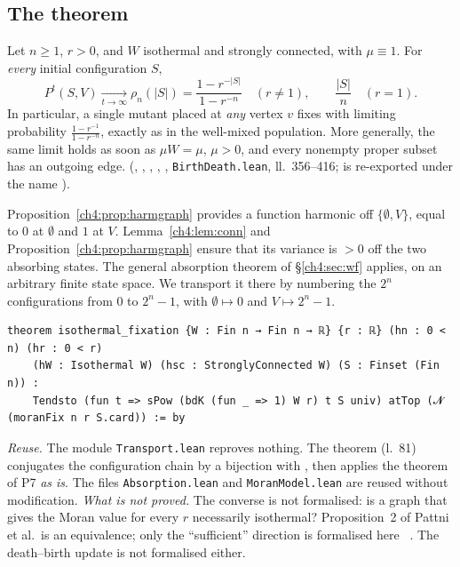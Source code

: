 \subsection{The theorem}
\begin{theorem}\label{ch4:thm:iso}
Let $n\ge1$, $r>0$, and $W$ isothermal and strongly connected, with $\mu\equiv1$. For \emph{every} initial
configuration $S$,
\[
P^t(S,V)\xrightarrow[t\to\infty]{}\rho_n(|S|)=\frac{1-r^{-|S|}}{1-r^{-n}}\quad(r\ne1),\qquad\frac{|S|}{n}\quad(r=1).
\]
In particular, a single mutant placed at \emph{any} vertex $v$ fixes with limiting probability
$\frac{1-r^{-1}}{1-r^{-n}}$, exactly as in the well-mixed population. More generally, the same limit
holds as soon as $\mu W=\mu$, $\mu>0$, and every nonempty proper subset has an outgoing edge.
\tierA{} (, , ,
, , \texttt{BirthDeath.lean}, ll.~356--416;  is re-exported under the name ).
\end{theorem}

\begin{humanproof}
Proposition~\ref{ch4:prop:harmgraph} provides a function harmonic off $\{\emptyset,V\}$, equal to $0$ at
$\emptyset$ and $1$ at $V$. Lemma~\ref{ch4:lem:conn} and Proposition~\ref{ch4:prop:harmgraph} ensure that its
variance is $>0$ off the two absorbing states. The general absorption theorem of §\ref{ch4:sec:wf}
applies, on an arbitrary finite state space. We transport it there by numbering the $2^n$ configurations from
$0$ to $2^n-1$, with $\emptyset\mapsto0$ and $V\mapsto2^n-1$.
\end{humanproof}

\begin{leanbox}
\begin{lstlisting}[language=Lean]
theorem isothermal_fixation {W : Fin n → Fin n → ℝ} {r : ℝ} (hn : 0 < n) (hr : 0 < r)
    (hW : Isothermal W) (hsc : StronglyConnected W) (S : Finset (Fin n)) :
    Tendsto (fun t => sPow (bdK (fun _ => 1) W r) t S univ) atTop (𝓝 (moranFix n r S.card)) := by
\end{lstlisting}
\emph{Reuse.} The module \texttt{Transport.lean} reproves nothing. The theorem
 (l.~81) conjugates the configuration chain by a bijection with
, then applies the theorem  of P7 \emph{as is}. The files
\texttt{Absorption.lean} and \texttt{MoranModel.lean} are reused without modification.
\emph{What is not proved.} The converse is not formalised: is a graph that gives the Moran value for
every $r$ necessarily isothermal? Proposition~2 of Pattni et al.\ is an equivalence; only the ``sufficient'' direction
is formalised here \tierL{}~\cite{ch4:PBRS}. The death--birth update is not formalised either.
\end{leanbox}

